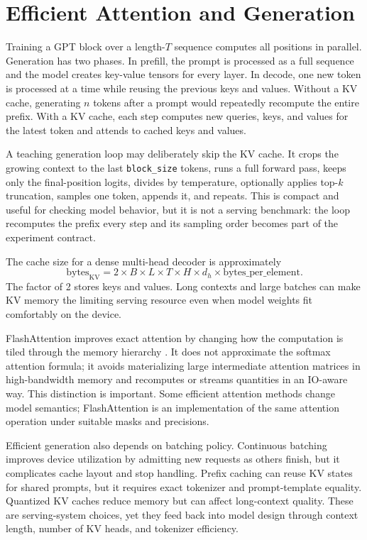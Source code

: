 \section{Efficient Attention and Generation}
\label{sec:gpt-efficient-attention-generation}

Training a GPT block over a length-$T$ sequence computes all positions in parallel. Generation has two phases. In prefill, the prompt is processed as a full sequence and the model creates key-value tensors for every layer. In decode, one new token is processed at a time while reusing the previous keys and values. Without a KV cache, generating $n$ tokens after a prompt would repeatedly recompute the entire prefix. With a KV cache, each step computes new queries, keys, and values for the latest token and attends to cached keys and values.

A teaching generation loop may deliberately skip the KV cache. It crops the growing context to the last \texttt{block\_size} tokens, runs a full forward pass, keeps only the final-position logits, divides by temperature, optionally applies top-$k$ truncation, samples one token, appends it, and repeats. This is compact and useful for checking model behavior, but it is not a serving benchmark: the loop recomputes the prefix every step and its sampling order becomes part of the experiment contract.

The cache size for a dense multi-head decoder is approximately
\begin{equation}
  \mathrm{bytes}_{\mathrm{KV}}
  = 2 \times B \times L \times T \times H \times d_h
    \times \mathrm{bytes\_per\_element}.
\end{equation}
The factor of 2 stores keys and values. Long contexts and large batches can make KV memory the limiting serving resource even when model weights fit comfortably on the device.

FlashAttention improves exact attention by changing how the computation is tiled through the memory hierarchy \cite{dao2022flashattention}. It does not approximate the softmax attention formula; it avoids materializing large intermediate attention matrices in high-bandwidth memory and recomputes or streams quantities in an IO-aware way. This distinction is important. Some efficient attention methods change model semantics; FlashAttention is an implementation of the same attention operation under suitable masks and precisions.

Efficient generation also depends on batching policy. Continuous batching improves device utilization by admitting new requests as others finish, but it complicates cache layout and stop handling. Prefix caching can reuse KV states for shared prompts, but it requires exact tokenizer and prompt-template equality. Quantized KV caches reduce memory but can affect long-context quality. These are serving-system choices, yet they feed back into model design through context length, number of KV heads, and tokenizer efficiency.

